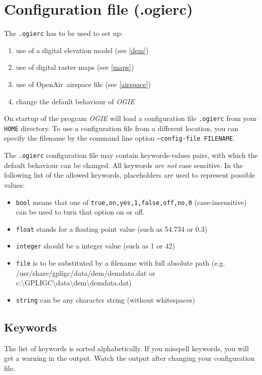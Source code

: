 \section{Configuration file (.ogierc)}
\label{config}

The \texttt{.ogierc} has to be used to set up:


\begin{enumerate}
\item use of a digital elevation model (see \ref{dem})
\item use of digital raster maps (see \ref{maps})
\item use of OpenAir\texttrademark\ airspace file (see \ref{airspace})
\item change the default behaviour of \emph{OGIE}
\end{enumerate}


On  startup of the program  \emph{OGIE} will load a configuration file
\texttt{.ogierc} from your \texttt{HOME} directory.
To use a configuration file from a different location, you can specify the filename by the command line option
\texttt{--config-file FILENAME}.


The \texttt{.ogierc} configuration file may contain keywords-values pairs,
with which the default behaviour can be changed. All keywords \emph{are not} case sensitive.
In the following list of the allowed keywords,  placeholders are used to represent possible values:

\begin{itemize}
\item \texttt{bool} means that one of \texttt{true,on,yes,1,false,off,no,0} (case-insensitive) can be used to turn that option on or off.
\item \texttt{float} stands for a floating point value (such as 54.734 or 0.3)
\item \texttt{integer} should be a integer value (such as 1 or 42)
\item \texttt{file} is to be substituted by a filename with full absolute path (e.g. /usr/share/gpligc/data/dem/demdata.dat or c:\textbackslash GPLIGC\textbackslash data\textbackslash dem\textbackslash demdata.dat)
\item \texttt{string} can be any character string (without whitespaces)
\end{itemize}


\subsection{Keywords}
The list of keywords is sorted alphabetically.
If you misspell keywords, you will get a warning in the output. Watch the output after changing your configuration file.


